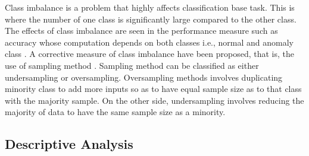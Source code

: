 \documentclass[final,5p,times,twocolumn,authoryear]{elsarticle}
\newcommand{\tannote}[1]{\todo[inline, color=orange]{#1}}
\begin{document}
Class imbalance is a problem that highly affects classification base task. This is where the number of one class is significantly large compared to the other class. The effects of class imbalance are seen in the performance measure such as accuracy whose computation depends on both classes i.e., normal and anomaly class \cite{awoyemi2017credit}. A corrective measure of class imbalance have been proposed, that is, the use of sampling method \cite{brownlee2016master}. Sampling method can be classified as either undersampling or oversampling.  Oversampling methods involves duplicating minority class to add more inputs so as to have equal sample size as to that class with the majority sample. On the other side, undersampling involves reducing the majority of data to have the same sample size as a minority.
 



\subsection{Descriptive Analysis}
\end{document}
